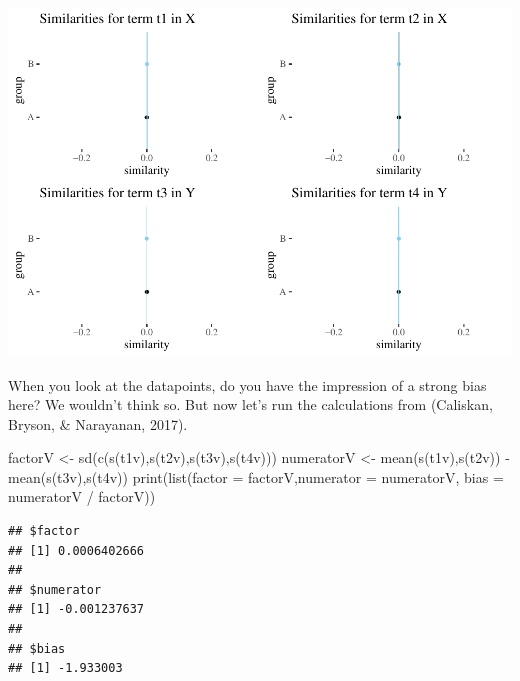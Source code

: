 \documentclass[
  10pt,
  dvipsnames,enabledeprecatedfontcommands]{scrartcl}
\newenvironment{Shaded}{\begin{snugshade}}{\end{snugshade}}
\newcommand{\AttributeTok}[1]{\textcolor[rgb]{0.77,0.63,0.00}{#1}}
\newcommand{\FunctionTok}[1]{\textcolor[rgb]{0.00,0.00,0.00}{#1}}
\newcommand{\NormalTok}[1]{#1}
\newcommand{\OtherTok}[1]{\textcolor[rgb]{0.56,0.35,0.01}{#1}}
\newcommand{\SpecialCharTok}[1]{\textcolor[rgb]{0.00,0.00,0.00}{#1}}
\begin{document}
\normalsize

\begin{center}\includegraphics[width=1\linewidth]{paperDraft_files/figure-latex/unnamed-chunk-6-1} \end{center}

\noindent When you look at the datapoints, do you have the impression of
a strong bias here? We wouldn't think so. But now let's run the
calculations from (Caliskan, Bryson, \& Narayanan, 2017).

\vspace{1mm}
\footnotesize

\begin{Shaded}
\begin{Highlighting}[]
\NormalTok{factorV }\OtherTok{\textless{}{-}} \FunctionTok{sd}\NormalTok{(}\FunctionTok{c}\NormalTok{(}\FunctionTok{s}\NormalTok{(t1v),}\FunctionTok{s}\NormalTok{(t2v),}\FunctionTok{s}\NormalTok{(t3v),}\FunctionTok{s}\NormalTok{(t4v)))}
\NormalTok{numeratorV }\OtherTok{\textless{}{-}}  \FunctionTok{mean}\NormalTok{(}\FunctionTok{s}\NormalTok{(t1v),}\FunctionTok{s}\NormalTok{(t2v)) }\SpecialCharTok{{-}} \FunctionTok{mean}\NormalTok{(}\FunctionTok{s}\NormalTok{(t3v),}\FunctionTok{s}\NormalTok{(t4v))}
\FunctionTok{print}\NormalTok{(}\FunctionTok{list}\NormalTok{(}\AttributeTok{factor =}\NormalTok{ factorV,}\AttributeTok{numerator =}\NormalTok{ numeratorV, }\AttributeTok{bias =}\NormalTok{ numeratorV }\SpecialCharTok{/}\NormalTok{ factorV))}
\end{Highlighting}
\end{Shaded}

\begin{verbatim}
## $factor
## [1] 0.0006402666
## 
## $numerator
## [1] -0.001237637
## 
## $bias
## [1] -1.933003
\end{verbatim}
\end{document}
